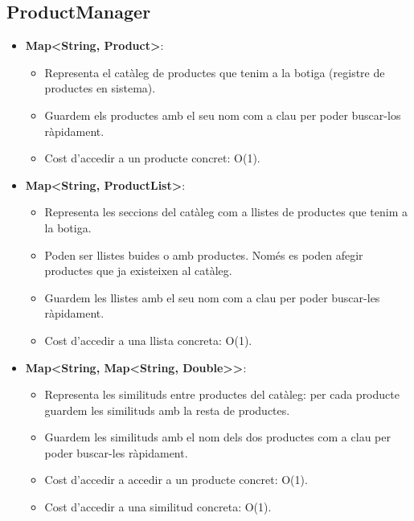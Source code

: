 \documentclass[a4paper, t]{article}
\begin{document}
\subsection{ProductManager}
\begin{itemize}
    \item \textbf{Map\textless String, Product\textgreater}: 
    \begin{itemize}
        \item Representa el catàleg de productes que tenim a la botiga (registre de productes en sistema).
        \item Guardem els productes amb el seu nom com a clau per poder buscar-los ràpidament.
        \item Cost d’accedir a un producte concret: O(1).
    \end{itemize}
    \item \textbf{Map\textless String, ProductList\textgreater}: 
    \begin{itemize}
        \item Representa les seccions del catàleg com a llistes de productes que tenim a la botiga.
        \item Poden ser llistes buides o amb productes. Només es poden afegir productes que ja existeixen al catàleg.
        \item Guardem les llistes amb el seu nom com a clau per poder buscar-les ràpidament.
        \item Cost d’accedir a una llista concreta: O(1).
    \end{itemize}
    \item \textbf{Map\textless String, Map\textless String, Double\textgreater\textgreater}: 
    \begin{itemize}
        \item Representa les similituds entre productes del catàleg: per cada producte guardem les similituds amb la resta de productes.
        \item Guardem les similituds amb el nom dels dos productes com a clau per poder buscar-les ràpidament.
        \item Cost d’accedir a accedir a un producte concret: O(1).
        \item Cost d’accedir a una similitud concreta: O(1).
    \end{itemize}
\end{itemize}
\end{document}
